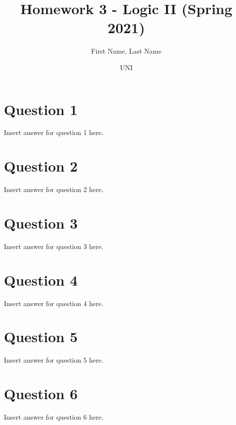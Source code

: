 \documentclass{article}
\title{Homework 3 - Logic II (Spring 2021)}
\author
{
First Name, Last Name
\and UNI
}
\begin{document}
    \maketitle
    
    \section*{Question 1}
    Insert answer for question 1 here.
    \newpage
    \section*{Question 2}
    Insert answer for question 2 here.
    \newpage
    \section*{Question 3}
    Insert answer for question 3 here.
    \newpage
    \section*{Question 4}
    Insert answer for question 4 here.
    \newpage
    \section*{Question 5}
    Insert answer for question 5 here.
    \newpage
    \section*{Question 6}
    Insert answer for question 6 here.    
   

   
\end{document}
